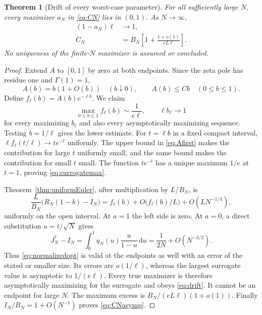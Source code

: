 \documentclass[11pt]{article}
\numberwithin{equation}{section}
\newtheorem{theorem}{Theorem}[section]
\theoremstyle{definition}\newtheorem{definition}[theorem]{Definition}
\theoremstyle{remark}\newtheorem{remark}[theorem]{Remark}
\newcommand{\dd}{\,\mathrm d}
\begin{document}
\begin{theorem}[Drift of every worst-case parameter]\label{thm:drift}
For all sufficiently large $N$, every maximizer $a_N$ in
\eqref{eq:CN} lies in $(0,1)$. As $N\to\infty$,
\begin{align}
 (1-a_N)\ell&\longrightarrow1,
 \label{eq:drift}\\
 C_N&=B_N\left[1+\frac{1+o(1)}{eL\ell}\right].
 \label{eq:CNasymp}
\end{align}
No uniqueness of the finite-$N$ maximizer is assumed or concluded.
\end{theorem}
\begin{proof}
Extend $A$ to $[0,1]$ by zero at both endpoints. Since the zeta pole
has residue one and $\Gamma(1)=1$,
\begin{equation}\label{eq:Afirst}
 A(b)=b(1+O(b))\quad(b\downarrow0),
 \qquad A(b)\le Cb\quad(0\le b\le1).
\end{equation}
Define $f_\ell(b)=A(b)e^{-\ell b}$. We claim
\begin{equation}\label{eq:surrogatemax}
 \max_{0\le b\le1}f_\ell(b)\sim\frac1{e\ell},
 \qquad \ell b_\ell\to1
\end{equation}
for every maximizing $b_\ell$ and also every asymptotically maximizing
sequence. Testing $b=1/\ell$ gives the lower estimate. For
$t=\ell b$ in a fixed compact interval,
$\ell f_\ell(t/\ell)\to te^{-t}$ uniformly. The upper bound in
\eqref{eq:Afirst} makes the contribution for large $t$ uniformly small,
and the same bound makes the contribution for small $t$ small.
The function $te^{-t}$ has a unique maximum $1/e$ at $t=1$, proving
\eqref{eq:surrogatemax}.

Theorem~\ref{thm:uniformEuler}, after multiplication by $L/B_N$, is
\begin{equation}\label{eq:normalizedopt}
 \frac{L}{B_N}\bigl(R_N(1-b)-I_N\bigr)
 =f_\ell(b)+O\bigl(f_\ell(b)/L\bigr)+O(LN^{-1/4}),
\end{equation}
uniformly on the open interval. At $a=1$ the left side is zero.
At $a=0$, a direct substitution $u=t/\sqrt N$ gives
\begin{equation}\label{eq:JminusI}
 J_N^*-I_N
 =\int_0^1q_N(u)\frac{u}{1-u}\dd u
 =\frac1{2N}+O(N^{-3/2}).
\end{equation}
Thus \eqref{eq:normalizedopt} is valid at the endpoints as well with
an error of the stated or smaller size. Its errors are $o(1/\ell)$,
whereas the largest surrogate value is asymptotic to $1/(e\ell)$.
Every true maximizer is therefore asymptotically maximizing for the
surrogate and obeys \eqref{eq:drift}. It cannot be an endpoint for
large $N$. The maximum excess is
$B_N/(eL\ell)(1+o(1))$. Finally
$I_N/B_N=1+O(N^{-1})$ proves \eqref{eq:CNasymp}.
\end{proof}
\end{document}
